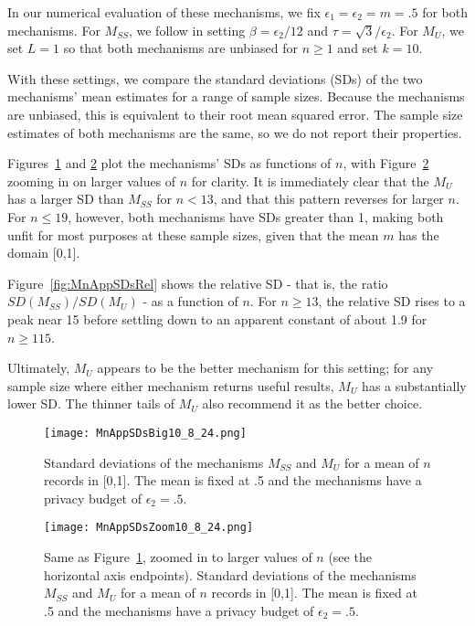 \documentclass[11pt]{article}
\begin{document}
In our numerical evaluation of these mechanisms, we fix $\epsilon_1 = \epsilon_2 = m = .5$ for both mechanisms. For $M_{SS}$, we follow \cite{KamathEtAl2023Trilemma} in setting $\beta = \epsilon_2/12$ and $\tau = \sqrt{3}/\epsilon_2$. For $M_U$, we set $L = 1$ so that both mechanisms are unbiased for $n \geq 1$ and set $k=10$. 

With these settings, we compare the standard deviations (SDs) of the two mechanisms' mean estimates for a range of sample sizes. Because the mechanisms are unbiased, this is equivalent to their root mean squared error. The sample size estimates of both mechanisms are the same, so we do not report their properties.



Figures~\ref{fig:MnAppSDsBig} and \ref{fig:MnAppSDsZoom} plot the mechanisms' SDs as functions of $n$, with Figure~\ref{fig:MnAppSDsZoom} zooming in on larger values of $n$ for clarity. It is immediately clear that the $M_U$ has a larger SD than $M_{SS}$ for $n < 13$, and that this pattern reverses for larger $n$. For $n \leq 19$, however, both mechanisms have SDs greater than 1, making both unfit for most purposes at these sample sizes, given that the mean $m$ has the domain [0,1].

Figure~\ref{fig:MnAppSDsRel} shows the relative SD - that is, the ratio $SD(M_{SS})/SD(M_U)$ - as a function of $n$. For $n \geq 13$, the relative SD rises to a peak near 15 before settling down to an apparent constant of about 1.9 for $n \geq 115$.

Ultimately, $M_U$ appears to be the better mechanism for this setting; for any sample size where either mechanism returns useful results, $M_U$ has a substantially lower SD. The thinner tails of $M_U$ also recommend it as the better choice.


\begin{figure}[H]
    \centering
    \texttt{[image: MnAppSDsBig10\_8\_24.png]}
    \caption{Standard deviations of the mechanisms $M_{SS}$ and $M_U$ for a mean of $n$ records in [0,1]. The mean is fixed at .5 and the mechanisms have a privacy budget of $\epsilon_2 = .5$.}
    \label{fig:MnAppSDsBig}
\end{figure}

\begin{figure}[H]
    \centering
    \texttt{[image: MnAppSDsZoom10\_8\_24.png]}
    \caption{Same as Figure~\ref{fig:MnAppSDsBig}, zoomed in to larger values of $n$ (see the horizontal axis endpoints). Standard deviations of the mechanisms $M_{SS}$ and $M_U$ for a mean of $n$ records in [0,1]. The mean is fixed at .5 and the mechanisms have a privacy budget of $\epsilon_2 = .5$.}
    \label{fig:MnAppSDsZoom}
\end{figure}
\end{document}
